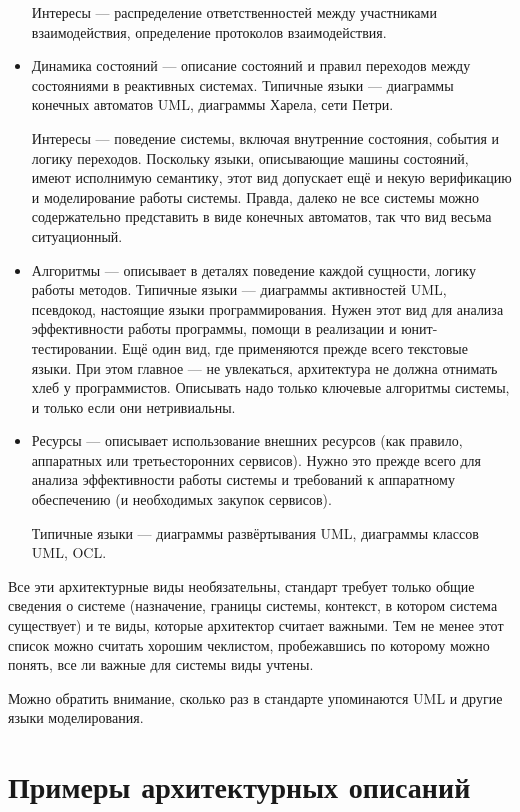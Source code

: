 \documentclass[a5paper]{article}
\begin{document}
\begin{itemize}
    Интересы --- распределение ответственностей между участниками взаимодействия, определение протоколов взаимодействия.
    
    \item Динамика состояний --- описание состояний и правил переходов между состояниями в реактивных системах. Типичные языки --- диаграммы конечных автоматов UML, диаграммы Харела, сети Петри.
    
    Интересы --- поведение системы, включая внутренние состояния, события и логику переходов. Поскольку языки, описывающие машины состояний, имеют исполнимую семантику, этот вид допускает ещё и некую верификацию и моделирование работы системы. Правда, далеко не все системы можно содержательно представить в виде конечных автоматов, так что вид весьма ситуационный.
    
    \item Алгоритмы --- описывает в деталях поведение каждой сущности, логику работы методов. Типичные языки --- диаграммы активностей UML, псевдокод, настоящие языки программирования. Нужен этот вид для  анализа эффективности работы программы, помощи в реализации и юнит-тестировании. Ещё один вид, где применяются прежде всего текстовые языки. При этом главное --- не увлекаться, архитектура не должна отнимать хлеб у программистов. Описывать надо только ключевые алгоритмы системы, и только если они нетривиальны.
    
    \item Ресурсы --- описывает использование внешних ресурсов (как правило, аппаратных или третьесторонних сервисов). Нужно это прежде всего для анализа эффективности работы системы и требований к аппаратному обеспечению (и необходимых закупок сервисов).
    
    Типичные языки --- диаграммы развёртывания UML, диаграммы классов UML, OCL.
\end{itemize}

Все эти архитектурные виды необязательны, стандарт требует только общие сведения о системе (назначение, границы системы, контекст, в котором система существует) и те виды, которые архитектор считает важными. Тем не менее этот список можно считать хорошим чеклистом, пробежавшись по которому можно понять, все ли важные для системы виды учтены.

Можно обратить внимание, сколько раз в стандарте упоминаются UML и другие языки моделирования.

\section{Примеры архитектурных описаний}
\end{document}
